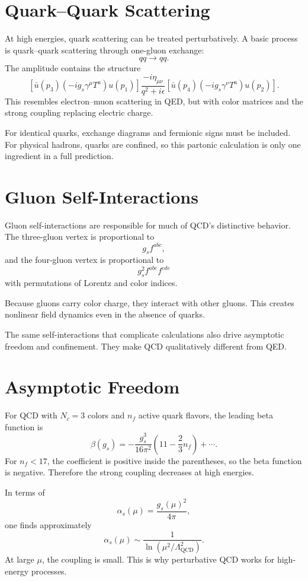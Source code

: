 \section{Quark--Quark Scattering}

At high energies, quark scattering can be treated perturbatively. A basic process
is quark--quark scattering through one-gluon exchange:
\[
    q q \longrightarrow q q.
\]
The amplitude contains the structure
\[
    [\bar u(p_3)(-ig_s\gamma^\mu T^a)u(p_1)]
    \frac{-i\eta_{\mu\nu}}{q^2+i\epsilon}
    [\bar u(p_4)(-ig_s\gamma^\nu T^a)u(p_2)].
\]
This resembles electron--muon scattering in QED, but with color matrices and the
strong coupling replacing electric charge.

For identical quarks, exchange diagrams and fermionic signs must be included.
For physical hadrons, quarks are confined, so this partonic calculation is only
one ingredient in a full prediction.

\section{Gluon Self-Interactions}

Gluon self-interactions are responsible for much of QCD's distinctive behavior.
The three-gluon vertex is proportional to
\[
    g_s f^{abc},
\]
and the four-gluon vertex is proportional to
\[
    g_s^2 f^{abe}f^{cde}
\]
with permutations of Lorentz and color indices.

Because gluons carry color charge, they interact with other gluons. This creates
nonlinear field dynamics even in the absence of quarks.

The same self-interactions that complicate calculations also drive asymptotic
freedom and confinement. They make QCD qualitatively different from QED.

\section{Asymptotic Freedom}

For QCD with \(N_c=3\) colors and \(n_f\) active quark flavors, the leading beta
function is
\[
    \beta(g_s)
    = -\frac{g_s^3}{16\pi^2}
      \left(11-\frac{2}{3}n_f\right)+\cdots.
\]
For \(n_f<17\), the coefficient is positive inside the parentheses, so the beta
function is negative. Therefore the strong coupling decreases at high energies.

In terms of
\[
    \alpha_s(\mu)=\frac{g_s(\mu)^2}{4\pi},
\]
one finds approximately
\[
    \alpha_s(\mu)\sim \frac{1}{\ln(\mu^2/\Lambda_{\mathrm{QCD}}^2)}.
\]
At large \(\mu\), the coupling is small. This is why perturbative QCD works for
high-energy processes.

